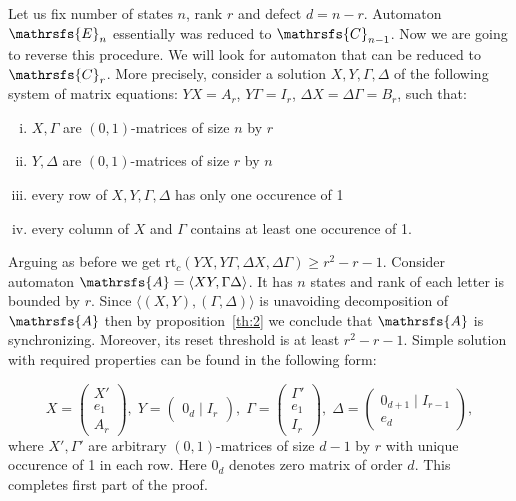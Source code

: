 \documentclass[11pt]{llncs}
\newcommand{\A}{\mathrsfs{A}}
\newcommand{\G}{\Gamma}
\newcommand{\D}{\Delta}
\newcommand{\rtc}{\mathrm{rt}_{c}}
\begin{document}
Let us fix number of states $n$, rank $r$ and defect $d = n - r$. Automaton $\mathrsfs{E}_n$ essentially was reduced to $\mathrsfs{C}_{n - 1}$.
Now we are going to reverse this procedure. We will look for automaton that can be reduced to $\mathrsfs{C}_r$.
More precisely, consider a solution $X,Y,\G,\D$ of the following system of matrix equations:
$YX = A_{r}$, $Y\G = I_{r}$, $\D X = \D \G = B_{r}$, such that:
\begin{enumerate}[(i)]
\item $X,\G$ are $(0,1)$-matrices of size $n$ by $r$
\item $Y,\D$ are $(0,1)$-matrices of size $r$ by $n$
\item every row of $X, Y, \G, \D$ has only one occurence of 1
\item every column of $X$ and $\G$ contains at least one occurence of 1.
\end{enumerate}
Arguing as before we get $\rtc(YX, Y\G, \D X, \D \G) \geq r^2 - r - 1$.
Consider automaton $\A = \langle XY, \G\D \rangle$. It has $n$ states and rank of each letter is bounded by $r$.
Since $\langle (X,Y), (\G, \D) \rangle$ is unavoiding decomposition of $\A$ then by proposition~\ref{th:2} we 
conclude that $\A$ is synchronizing.
Moreover, its reset threshold is at least $r^2 - r - 1$.
Simple solution with required properties can be found in the following form:

$$
X =
\left(
\begin{array}{c}
X' \\
e_1 \\
A_r
\end{array}
\right),\;
Y = 
\left(
\begin{array}{c}
0_d \mid I_r
\end{array}
\right),\;
\G = 
\left(
\begin{array}{c}
\G' \\
e_1 \\
I_r
\end{array}
\right),\;
\D = 
\left(
\begin{array}{c}
0_{d + 1} \mid I_{r-1}\\ \hline
e_d
\end{array}
\right),
$$
where $X', \G'$ are arbitrary $(0,1)$-matrices of size $d-1$ by $r$ with unique occurence of 1
in each row. Here $0_{d}$ denotes zero matrix of order $d$. This completes first part of the proof.
\end{document}
